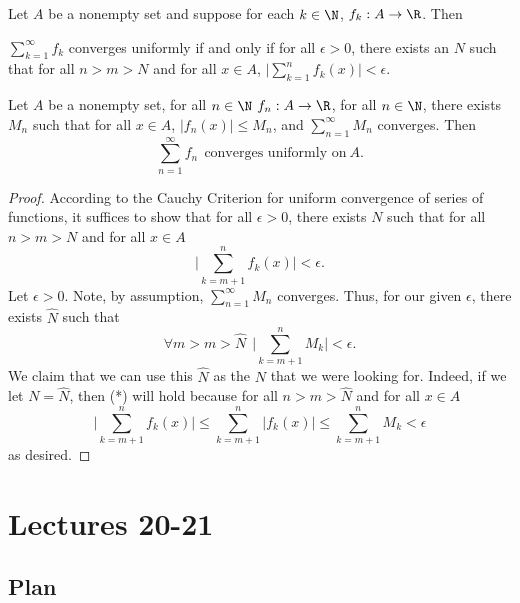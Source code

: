 \begin{theorem}
    Let \( A  \) be a nonempty set and suppose for each \( k \in \N  \), \( {f}_{k } : A \to \R  \). Then
    \begin{center}
        \( \displaystyle \sum_{ k=1  }^{ \infty  } {f}_{k } \) converges uniformly if and only if for all \(  \epsilon > 0  \), there exists an \( N  \) such that for all \( n > m > N  \) and for all \( x \in A  \), \( \displaystyle \Big| \sum_{ k=1  }^{ n } {f}_{k } (x) \Big| < \epsilon \).
    \end{center}
\end{theorem}

\begin{theorem}
    Let \( A  \) be a nonempty set, for all \( n \in \N  \) \( {f}_{n} : A \to \R  \), for all \(  n \in \N  \), there exists \( {M}_{n} \) such that for all \( x \in A  \), \( | {f}_{n}(x) |  \leq {M}_{n} \), and \( \displaystyle \sum_{ n=1  }^{ \infty  } {M}_{n}  \) converges. Then 
    \[  \sum_{ n=1  }^{ \infty  } {f}_{n} \ \ \text{converges uniformly on} \ A.  \]
\end{theorem}
\begin{proof}
    According to the Cauchy Criterion for uniform convergence of series of functions, it suffices to show that for all \( \epsilon > 0  \), there exists \( N  \) such that for all \( n > m > N  \)  and for all \( x \in A  \)
    \[  \Big| \sum_{ k=m+1  }^{ n  } {f}_{k } (x) \Big|  < \epsilon. \tag{*} \]
    Let \( \epsilon > 0 \).
    Note, by assumption, \( \displaystyle \sum_{ n=1  }^{ \infty  } {M}_{n} \) converges. Thus, for our given \( \epsilon  \), there exists \( \hat{N} \) such that 
    \[  \forall m > m > \hat{N} \ \ \Big| \sum_{ k = m + 1  }^{ n } {M}_{k }  \Big|  < \epsilon. \]
    We claim that we can use this \( \hat{N} \) as the \( N  \) that we were looking for. Indeed, if we let \( N = \hat{N} \), then (*) will hold because for all \( n > m > \hat{N} \) and for all \( x \in A  \)
    \[ \Big| \sum_{ k= m+1 }^{  n  } {f}_{k }(x) \Big|  \leq \sum_{ k = m + 1  }^{ n } | {f}_{k }(x) | \leq \sum_{ k= m + 1  }^{ n } {M}_{k } < \epsilon  \]
    as desired.
\end{proof}

\section{Lectures 20-21}

\subsection{Plan}

